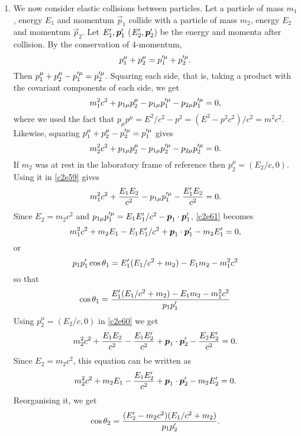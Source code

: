 \begin{enumerate}
\item We now consider elastic collisions between particles. Let a particle of
mass $m_1$, energy $E_1$ and momentum $\vec{p}_1$ collide with a particle of mass
$m_2$, energy $E_2$ and momentum $\vec{p}_2$. Let $E_1^\prime, \boldsymbol{p}_1^\prime$ ($E_2^\prime,
\boldsymbol{p}_2^\prime$) be the energy and momenta after collision. By the conservation of 
4-momentum,
\begin{equation}\label{c2e58}
p_1^\mu + p_2^\mu = p_1^{\prime\mu} + p_2^{\prime\mu}.
\end{equation}
Then $p_1^\mu + p_2^\mu - p_1^{\prime\mu} = p_2^{\prime\mu}$. Squaring each side, that
is, taking a product with the covariant components of each side, we get
\begin{equation}\label{c2e59}
m_1^2c^2 + p_{1\mu}p_2^\mu - p_{1\mu}p_1^{\prime\mu} - p_{2\mu}p_1^{\prime\mu} = 0,
\end{equation}
where we used the fact that $p_\mu p^\mu = E^2/c^2 - p^2 = (E^2 - p^2c^2)/c^2 =
m^2c^2$.
Likewise, squaring $p_1^\mu + p_2^\mu - p_2^{\prime\mu} = p_1^{\prime\mu}$ gives
\begin{equation}\label{c2e60}
m_2^2c^2 + p_{1\mu}p_2^\mu - p_{1\mu}p_2^{\prime\mu} - p_{2\mu}p_2^{\prime\mu} = 0.
\end{equation}
If $m_2$ was at rest in the laboratory frame of reference then $p_2^\mu = (E_2/c,
0)$. Using it in \eqref{c2e59} gives
\begin{equation}\label{c2e61}
m_1^2c^2 + \frac{E_1E_2}{c^2} - p_{1\mu}p_1^{\prime\mu} - \frac{E_1^\prime E_2}{c^2} = 0.
\end{equation}
Since $E_2 = m_2c^2$ and $p_{1\mu}p_1^{\prime\mu} = E_1E_1^\prime/c^2 - \boldsymbol{p}_1\cdot
\boldsymbol{p}_1^\prime$, \eqref{c2e61} becomes
\begin{equation}\label{c2e62}
m_1^2c^2 + m_2E_1 - E_1E_1^\prime/c^2 + \boldsymbol{p}_1\cdot\boldsymbol{p}_1^\prime - m_2E_1^\prime = 0,
\end{equation}
or
\[
p_1p_1^\prime\cos\theta_1 = E_1^\prime(E_1/c^2 + m_2) - E_1m_2 - m_1^2c^2
\]
so that
\begin{equation}\label{c2e63}
\cos\theta_1 = \frac{E_1^\prime(E_1/c^2 + m_2) - E_1m_2 - m_1^2c^2}{p_1p_1^\prime}
\end{equation}
Using $p_2^\mu = (E_2/c, 0)$ in \eqref{c2e60} we get
\[
m_2^2c^2 + \frac{E_1E_2}{c^2} - \frac{E_1E_2^\prime}{c^2} + 
\boldsymbol{p}_1\cdot\boldsymbol{p}_2^\prime - \frac{E_2E_2^\prime}{c^2} = 0.
\]
Since $E_2 = m_2c^2$, this equation can be written as
\[
m_2^2c^2 + m_2E_1 - \frac{E_1E_2^\prime}{c^2} + 
\boldsymbol{p}_1\cdot\boldsymbol{p}_2^\prime - m_2E_2^\prime = 0.
\]
Reorganising it, we get
\begin{equation}\label{c2e64}
\cos\theta_2 = \frac{(E_2^\prime - m_2c^2)(E_1/c^2 + m_2)}{p_1p_2^\prime}.
\end{equation}


\end{enumerate}
